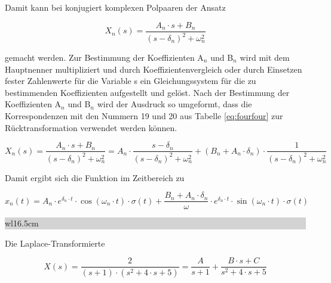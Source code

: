 \noindent Damit kann bei konjugiert komplexen Polpaaren der Ansatz 

\begin{equation}\label{eq:fourhundredsthirtytwo}
X_{n} \left(s\right)=\frac{A_{n} \cdot s+B_{n} }{\left(s-\delta _{n} \right)^{2} +\omega _{n}^{2} }
\end{equation}

\noindent gemacht werden. Zur Bestimmung der Koeffizienten A$_{n}$ und B$_{n}$ wird mit dem Hauptnenner multipliziert und durch Koeffizientenvergleich oder durch Einsetzen fester Zahlenwerte für die Variable s ein Gleichungssystem für die zu bestimmenden Koeffizienten aufgestellt und gelöst. Nach der Bestimmung der Koeffizienten A$_{n}$ und B$_{n}$ wird der Ausdruck so umgeformt, dass die Korrespondenzen mit den Nummern 19 und 20 aus Tabelle \ref{eq:fourfour} zur Rücktransformation verwendet werden können.

\begin{equation}\label{eq:fourhundredsthirtythree}
X_{n} \left(s\right)=\frac{A_{n} \cdot s+B_{n} }{\left(s-\delta _{n} \right)^{2} +\omega _{n}^{2} } =A_{n} \cdot \frac{s-\delta _{n} }{\left(s-\delta _{n} \right)^{2} +\omega _{n}^{2} } +\left(B_{n} +A_{n} \cdot \delta _{n} \right)\cdot \frac{1}{\left(s-\delta _{n} \right)^{2} +\omega _{n}^{2} }
\end{equation}

\noindent Damit ergibt sich die Funktion im Zeitbereich zu

\begin{equation}\label{eq:fourhundredsthirtyfour}
x_{n} \left(t\right)=A_{n} \cdot e^{\delta _{n} \cdot t} \cdot \cos \left(\omega _{n} \cdot t\right)\cdot \sigma \left(t\right)+\frac{B_{n} +A_{n} \cdot \delta _{n} }{\omega } \cdot e^{\delta _{n} \cdot t} \cdot \sin \left(\omega _{n} \cdot t\right)\cdot \sigma \left(t\right)
\end{equation}

\noindent
\colorbox{lightgray}{%
%
\renewcommand\arraystretch{0.6}%
\begin{tabular}{ wl{16.5cm} }
{\selectfont{Beispiel: Partialbruchzerlegung für konjugiert komplexe Polpaare $\alpha$ = $\delta$ $\pm$ j$\cdot\omega$} }
\end{tabular}%
}\bigskip

\noindent Die Laplace-Transformierte 

\begin{equation}\label{eq:fourhundredsthirtyfive}
X\left(s\right)=\frac{2}{\left(s+1\right)\cdot \left(s^{2} +4\cdot s+5\right)} =\frac{A}{s+1} +\frac{B\cdot s+C}{s^{2} +4\cdot s+5} 
\end{equation}

